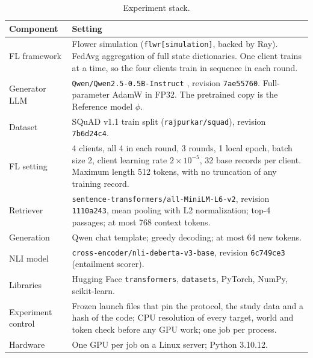 \documentclass[11pt]{article}
\begin{document}
\begin{table}[tbp]
\centering
\small
\caption{Experiment stack.}\label{tab:stack}
\begin{tabular}{@{}L{0.25\textwidth}L{0.69\textwidth}@{}}
\toprule
Component & Setting \\
\midrule
FL framework & Flower simulation \citep{beutel2020flower} (\texttt{flwr[simulation]}, backed by Ray). FedAvg aggregation of full state dictionaries. One client trains at a time, so the four clients train in sequence in each round. \\
Generator LLM & \texttt{Qwen/Qwen2.5-0.5B-Instruct} \citep{qwen2025}, revision \texttt{7ae55760}. Full-parameter AdamW in FP32. The pretrained copy is the Reference model $\phi$. \\
Dataset & SQuAD v1.1 train split \citep{rajpurkar2016squad} (\texttt{rajpurkar/squad}), revision \texttt{7b6d24c4}. \\
FL setting & 4 clients, all 4 in each round, 3 rounds, 1 local epoch, batch size 2, client learning rate $2\times10^{-5}$, 32 base records per client. Maximum length 512 tokens, with no truncation of any training record. \\
Retriever & \texttt{sentence-transformers/all-MiniLM-L6-v2}, revision \texttt{1110a243}, mean pooling with L2 normalization; top-4 passages; at most 768 context tokens. \\
Generation & Qwen chat template; greedy decoding; at most 64 new tokens. \\
NLI model & \texttt{cross-encoder/nli-deberta-v3-base}, revision \texttt{6c749ce3} (entailment scorer). \\
Libraries & Hugging Face \texttt{transformers}, \texttt{datasets}, PyTorch, NumPy, scikit-learn. \\
Experiment control & Frozen launch files that pin the protocol, the study data and a hash of the code; CPU resolution of every target, world and token check before any GPU work; one job per process. \\
Hardware & One GPU per job on a Linux server; Python 3.10.12. \\
\bottomrule
\end{tabular}
\end{table}
\end{document}
